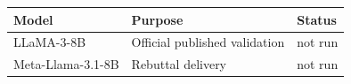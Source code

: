 \begin{tabular}{lll}
\toprule
Model & Purpose & Status \\
\midrule
LLaMA-3-8B & Official published validation & not run \\
Meta-Llama-3.1-8B & Rebuttal delivery & not run \\
\bottomrule
\end{tabular}
